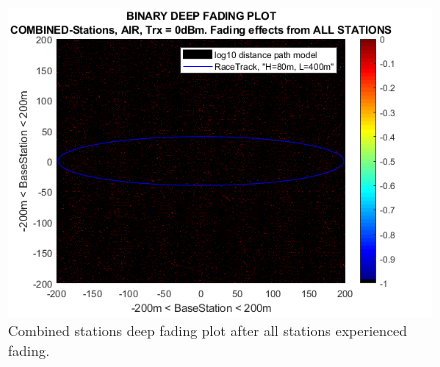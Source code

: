 \begin{figure}[h]
	\centering
	\includegraphics[width=\linewidth]{theory/fading/fig/binaryDeepFading_combinedStations_allStations.png}
	\caption{Combined stations deep fading plot after all stations experienced fading.}
	\label{fig:binaryDeepFading_combinedStations_allStations}
\end{figure}

